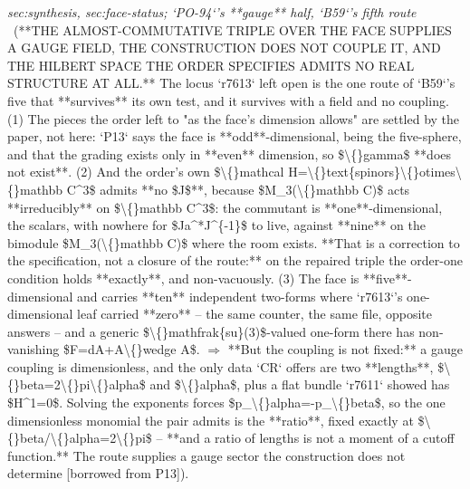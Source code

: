 \begin{description}
\textit{sec:synthesis, sec:face-status; `PO-94`'s **gauge** half, `B59`'s fifth route} \ (**THE ALMOST-COMMUTATIVE TRIPLE OVER THE FACE SUPPLIES A GAUGE FIELD, THE CONSTRUCTION DOES NOT COUPLE IT, AND THE HILBERT SPACE THE ORDER SPECIFIES ADMITS NO REAL STRUCTURE AT ALL.** The locus `r7613` left open is the one route of `B59`'s five that **survives** its own test, and it survives with a field and no coupling. (1) The pieces the order left to "as the face's dimension allows" are settled by the paper, not here: `P13` says the face is **odd**-dimensional, being the five-sphere, and that the grading exists only in **even** dimension, so \$\textbackslash\{\}gamma\$ **does not exist**. (2) And the order's own \$\textbackslash\{\}mathcal H=\textbackslash\{\}text\{spinors\}\textbackslash\{\}otimes\textbackslash\{\}mathbb C\textasciicircum{}3\$ admits **no \$J\$**, because \$M\_3(\textbackslash\{\}mathbb C)\$ acts **irreducibly** on \$\textbackslash\{\}mathbb C\textasciicircum{}3\$: the commutant is **one**-dimensional, the scalars, with nowhere for \$Ja\textasciicircum{}*J\textasciicircum{}\{-1\}\$ to live, against **nine** on the bimodule \$M\_3(\textbackslash\{\}mathbb C)\$ where the room exists.  **That is a correction to the specification, not a closure of the route:** on the repaired triple the order-one condition holds **exactly**, and non-vacuously. (3) The face is **five**-dimensional and carries **ten** independent two-forms where `r7613`'s one-dimensional leaf carried **zero** -- the same counter, the same file, opposite answers -- and a generic \$\textbackslash\{\}mathfrak\{su\}(3)\$-valued one-form there has non-vanishing \$F=dA+A\textbackslash\{\}wedge A\$. \ensuremath{\Rightarrow} **But the coupling is not fixed:** a gauge coupling is dimensionless, and the only data `CR` offers are two **lengths**, \$\textbackslash\{\}beta=2\textbackslash\{\}pi\textbackslash\{\}alpha\$ and \$\textbackslash\{\}alpha\$, plus a flat bundle `r7611` showed has \$H\textasciicircum{}1=0\$. Solving the exponents forces \$p\_\textbackslash\{\}alpha=-p\_\textbackslash\{\}beta\$, so the one dimensionless monomial the pair admits is the **ratio**, fixed exactly at \$\textbackslash\{\}beta/\textbackslash\{\}alpha=2\textbackslash\{\}pi\$ -- **and a ratio of lengths is not a moment of a cutoff function.** The route supplies a gauge sector the construction does not determine [borrowed from P13]). 

\end{description}
